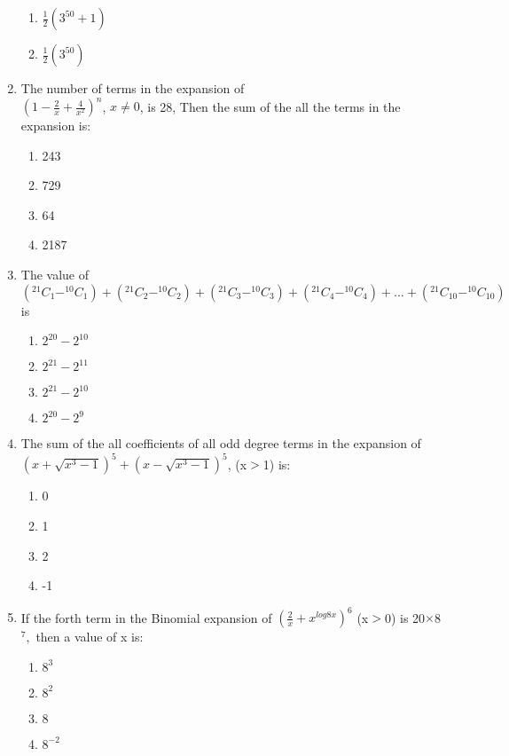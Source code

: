 \begin{enumerate}[label=\arabic*.,ref=\thesubsection.\theenumi]
\begin{enumerate}
    \item $\frac{1}{2} (3^{50}+1)$
    \item $\frac{1}{2} (3^{50})$
\end{enumerate}
\item The number of terms in the expansion of \\$(1-\frac{2}{x}+\frac{4}{x^2})^n$, $x \neq 0$, is 28, Then the sum of the all the terms in the expansion is:
\begin{enumerate}
    \item 243
    \item 729
    \item 64
    \item 2187
\end{enumerate}
\item The value of $(^{21}C_1- ^{10}C_1)+(^{21}C_2- ^{10}C_2)+(^{21}C_3- ^{10}C_3)+(^{21}C_4- ^{10}C_4)+...+(^{21}C_{10}- ^{10}C_{10})$ is
\begin{enumerate}
    \item $2^{20}-2^{10}$
    \item $2^{21}-2^{11}$
    \item $2^{21}-2^{10}$
    \item $2^{20}-2^{9}$
\end{enumerate}
\item The sum of the all coefficients of all odd degree terms in the expansion of \\$(x+\sqrt{x^3-1})^5+(x-\sqrt{x^3-1})^5$, (x$>$1) is:
\begin{enumerate}
    \item 0
    \item 1
    \item 2
    \item -1
\end{enumerate}
\item If the forth term in the Binomial expansion of $(\frac{2}{x}+x^{log 8x})^6$ (x$>$0) is 20$\times$8$^7,$ then a value of x is:
\begin{enumerate}
    \item $8^3$
    \item $8^2$
    \item $8$
    \item $8^{-2}$
\end{enumerate}
\end{enumerate}
%
    
